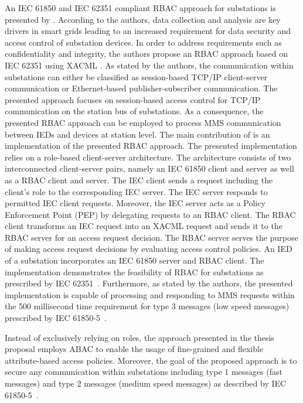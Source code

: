 An IEC 61850 and IEC 62351 compliant RBAC approach for substations is presented by \citeauthor{Lee2015} \cite{Lee2015}.
According to the authors, data collection and analysis are key drivers in smart grids leading to an increased requirement for data security and access control of substation devices.
In order to address requirements such as confidentiality and integrity, the authors propose an RBAC approach based on IEC 62351 \cite{IEC62351P8} using XACML \cite{Oasis2013}.
As stated by the authors, the communication within substations can either be classified as session-based TCP/IP client-server communication or Ethernet-based publisher-subscriber communication.
The presented approach focuses on session-based access control for TCP/IP communication on the station bus of substations.
As a consequence, the presented RBAC approach can be employed to process MMS communication between IEDs and devices at station level.
The main contribution of \citeauthor{Lee2015} is an implementation of the presented RBAC approach.
The presented implementation relies on a role-based client-server architecture.
The architecture consists of two interconnected client-server pairs, namely an IEC 61850 client and server as well as a RBAC client and server.
The IEC client sends a request including the client's role to the corresponding IEC server.
The IEC server responds to permitted IEC client requests.
Moreover, the IEC server acts as a Policy Enforcement Point (PEP) by delegating requests to an RBAC client.
The RBAC client transforms an IEC request into an XACML request and sends it to the RBAC server for an access request decision.
The RBAC server serves the purpose of making access request decisions by evaluating access control policies.
An IED of a substation incorporates an IEC 61850 server and RBAC client.
The implementation demonstrates the feasibility of RBAC for substations as prescribed by IEC 62351~\cite{IEC62351P8}.
Furthermore, as stated by the authors, the presented implementation is capable of processing and responding to MMS requests within the 500 millisecond time requirement for type 3 messages (low speed messages) prescribed by IEC 61850-5~\cite{IEC61850P5}.

Instead of exclusively relying on roles, the approach presented in the thesis proposal employs ABAC to enable the usage of fine-grained and flexible attribute-based access policies.
Moreover, the goal of the proposed approach is to secure any communication within substations including type 1 messages (fast messages) and type 2 messages (medium speed messages) as described by IEC 61850-5~\cite{IEC61850P5}.

